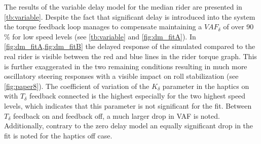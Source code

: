 The results of the variable delay model for the median rider are presented in \cref{tb:variable}.  Despite the fact that significant delay is introduced into the system the torque feedback loop manages to compensate maintaining a \ensuremath{\mathit{VAF}_\delta} of over 90 \% for low speed levels (see \cref{tb:variable} and \cref{fig:dm_fitA}). In \cref{fig:dm_fitA,fig:dm_fitB} the delayed response of the simulated compared to the real rider is visible between the red and blue lines in the rider torque graph. This is further exaggerated in the two remaining conditions resulting in much more oscillatory steering responses with a visible impact on roll stabilization (see \cref{fig:paper8}). The coefficient of variation of the \ensuremath{K_\delta} parameter in the haptics on with \ensuremath{T_\delta} feedback connected is the highest especially for the two highest speed levels, which indicates that this parameter is not significant for the fit. Between \ensuremath{{T_\delta}} feedback on and feedback off, a much larger drop in VAF is noted. Additionally, contrary to the zero delay model an equally significant drop in the fit is noted for the haptics off case. 






